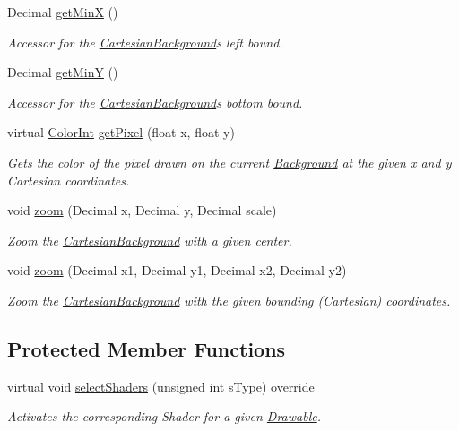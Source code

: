 \begin{DoxyCompactItemize}
Decimal \hyperlink{classtsgl_1_1_cartesian_background_a8bc9825516fb188932a992a5ad6baf49}{get\+MinX} ()
\begin{DoxyCompactList}\small\item\em Accessor for the \hyperlink{classtsgl_1_1_cartesian_background}{Cartesian\+Background}\textquotesingle{}s left bound. \end{DoxyCompactList}\item 
Decimal \hyperlink{classtsgl_1_1_cartesian_background_a732052e2af266586179855eea5b45361}{get\+MinY} ()
\begin{DoxyCompactList}\small\item\em Accessor for the \hyperlink{classtsgl_1_1_cartesian_background}{Cartesian\+Background}\textquotesingle{}s bottom bound. \end{DoxyCompactList}\item 
virtual \hyperlink{structtsgl_1_1_color_int}{Color\+Int} \hyperlink{classtsgl_1_1_cartesian_background_a36a3e803d2ffe16e2e1639359f7c7be5}{get\+Pixel} (float x, float y)
\begin{DoxyCompactList}\small\item\em Gets the color of the pixel drawn on the current \hyperlink{classtsgl_1_1_background}{Background} at the given x and y Cartesian coordinates. \end{DoxyCompactList}\item 
void \hyperlink{classtsgl_1_1_cartesian_background_afd50b54bbeeace2a72e39363f76a460f}{zoom} (Decimal x, Decimal y, Decimal scale)
\begin{DoxyCompactList}\small\item\em Zoom the \hyperlink{classtsgl_1_1_cartesian_background}{Cartesian\+Background} with a given center. \end{DoxyCompactList}\item 
void \hyperlink{classtsgl_1_1_cartesian_background_a7f4464f03382151b767387a0f7befd72}{zoom} (Decimal x1, Decimal y1, Decimal x2, Decimal y2)
\begin{DoxyCompactList}\small\item\em Zoom the \hyperlink{classtsgl_1_1_cartesian_background}{Cartesian\+Background} with the given bounding (Cartesian) coordinates. \end{DoxyCompactList}\end{DoxyCompactItemize}
\subsection*{Protected Member Functions}
\begin{DoxyCompactItemize}
\item 
virtual void \hyperlink{classtsgl_1_1_cartesian_background_a3d898bf3fe826c563e74c72e93cd3c74}{select\+Shaders} (unsigned int s\+Type) override
\begin{DoxyCompactList}\small\item\em Activates the corresponding Shader for a given \hyperlink{classtsgl_1_1_drawable}{Drawable}. \end{DoxyCompactList}\end{DoxyCompactItemize}
